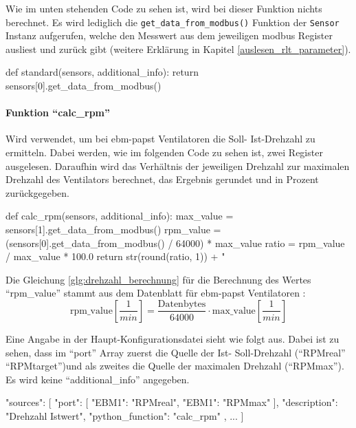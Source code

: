Wie im unten stehenden Code zu sehen ist, wird bei dieser Funktion nichts berechnet. Es wird lediglich die \lstinline{get_data_from_modbus()} Funktion der \lstinline{Sensor} Instanz aufgerufen, welche den Messwert aus dem jeweiligen \gls{modbus} Register ausliest und zurück gibt (weitere Erklärung in Kapitel \ref{auslesen_rlt_parameter}).

\begin{pythoncode}
def standard(sensors, additional_info):
	return sensors[0].get_data_from_modbus()
\end{pythoncode}


\paragraph{Funktion \enquote{calc\_rpm}}
Wird verwendet, um bei ebm-papst Ventilatoren die Soll- \bzw Ist-Drehzahl zu ermitteln. Dabei werden, wie im folgenden Code zu sehen ist, zwei Register ausgelesen. Daraufhin wird das Verhältnis der jeweiligen Drehzahl zur maximalen Drehzahl des Ventilators berechnet, das Ergebnis gerundet und in Prozent zurückgegeben.

\begin{pythoncode}
def calc_rpm(sensors, additional_info):
	max_value = sensors[1].get_data_from_modbus()
	rpm_value = (sensors[0].get_data_from_modbus() / 64000) * max_value
	ratio = rpm_value / max_value * 100.0
	return str(round(ratio, 1)) + " %
\end{pythoncode}

Die Gleichung \eqref{glg:drehzahl_berechnung} für die Berechnung des Wertes \enquote{rpm\_value} stammt aus dem Datenblatt für ebm-papst Ventilatoren \cite[vgl.][118,122]{ebmpapst:2020}: 
\begin{equation}
	\text{rpm\_value}\left[\frac{1}{min}\right] = \frac{\text{Datenbytes}}{64000} \cdot \text{max\_value} \left[\frac{1}{min}\right]
	\label{glg:drehzahl_berechnung}
\end{equation} 

Eine Angabe in der Haupt-Konfigurationsdatei sieht wie folgt aus. Dabei ist zu sehen, dass im \enquote{port} Array zuerst die Quelle der Ist- \bzw Soll-Drehzahl (\enquote{RPMreal} \bzw \enquote{RPMtarget})und als zweites die Quelle der maximalen Drehzahl (\enquote{RPMmax}). Es wird keine \enquote{additional\_info} angegeben.

\begin{jsoncode}
"sources": [
	{
		"port": [
			{"EBM1": "RPMreal"},
			{"EBM1": "RPMmax"}
		],
		"description": "Drehzahl Istwert",
		"python_function": "calc_rpm"
	},
	...
]
\end{jsoncode}



